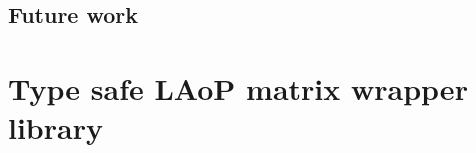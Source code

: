 \documentclass[
  oneside,
  11pt, a4paper,
  footinclude=true,
  headinclude=true,
  cleardoublepage=empty
]{scrbook}
\theoremstyle{definition}
\theoremstyle{definition}
\begin{document}
	    \section{Future work}
    

	

	
	
	
	\chapter{Type safe LAoP matrix wrapper library}\label{appendix-a}
	
\end{document}
